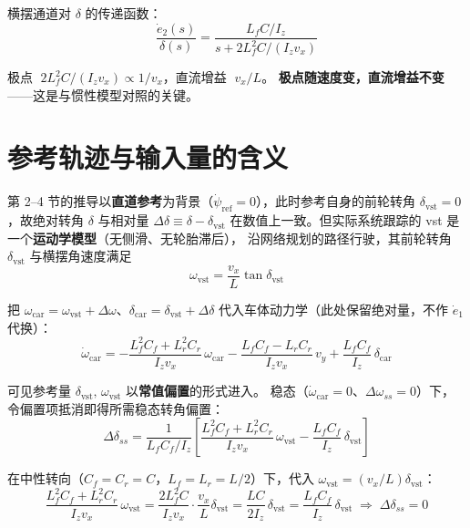 \documentclass[11pt,a4paper]{article}
\begin{document}
横摆通道对 $\delta$ 的传递函数：
\begin{equation}
\frac{\dot e_2(s)}{\delta(s)} = \frac{L_f C / I_z}{s + 2 L_f^2 C/(I_z v_x)}
\end{equation}

极点 $\;2 L_f^2 C/(I_z v_x) \propto 1/v_x$，直流增益 $\;v_x/L$。
\textbf{极点随速度变，直流增益不变}——这是与惯性模型对照的关键。

\section{参考轨迹与输入量的含义}

第 2--4 节的推导以\textbf{直道参考}为背景（$\dot\psi_{\text{ref}} = 0$），此时参考自身的前轮转角
$\delta_{\text{vst}} = 0$，故绝对转角 $\delta$ 与相对量 $\Delta\delta \equiv \delta - \delta_{\text{vst}}$
在数值上一致。但实际系统跟踪的 vst 是一个\textbf{运动学模型}（无侧滑、无轮胎滞后），
沿网络规划的路径行驶，其前轮转角 $\delta_{\text{vst}}$ 与横摆角速度满足
\begin{equation}
\omega_{\text{vst}} = \frac{v_x}{L}\tan\delta_{\text{vst}}
\end{equation}

把 $\omega_{\text{car}} = \omega_{\text{vst}} + \Delta\omega$、$\delta_{\text{car}} = \delta_{\text{vst}} + \Delta\delta$
代入车体动力学（此处保留绝对量，不作 $\dot e_1$ 代换）：
\begin{equation}
\dot\omega_{\text{car}} = -\frac{L_f^2 C_f + L_r^2 C_r}{I_z v_x}\,\omega_{\text{car}}
                        - \frac{L_f C_f - L_r C_r}{I_z v_x}\,v_y
                        + \frac{L_f C_f}{I_z}\,\delta_{\text{car}}
\end{equation}

可见参考量 $\delta_{\text{vst}},\,\omega_{\text{vst}}$ 以\textbf{常值偏置}的形式进入。
稳态（$\dot\omega_{\text{car}} = 0$、$\Delta\omega_{ss} = 0$）下，令偏置项抵消即得所需稳态转角偏置：
\begin{equation}
\Delta\delta_{ss} = \frac{1}{L_f C_f / I_z}
\left[\frac{L_f^2 C_f + L_r^2 C_r}{I_z v_x}\,\omega_{\text{vst}} - \frac{L_f C_f}{I_z}\,\delta_{\text{vst}}\right]
\end{equation}

在中性转向（$C_f = C_r = C$，$L_f = L_r = L/2$）下，代入 $\omega_{\text{vst}} = (v_x / L)\delta_{\text{vst}}$：
\begin{equation}
\frac{L_f^2 C_f + L_r^2 C_r}{I_z v_x}\,\omega_{\text{vst}}
= \frac{2 L_f^2 C}{I_z v_x}\cdot\frac{v_x}{L}\delta_{\text{vst}}
= \frac{L C}{2 I_z}\,\delta_{\text{vst}}
= \frac{L_f C_f}{I_z}\,\delta_{\text{vst}}
\;\Longrightarrow\;
\Delta\delta_{ss} = 0
\end{equation}
\end{document}
